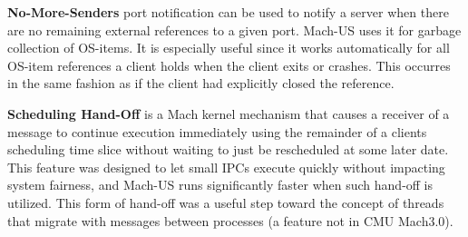 \begin{description}
\item{\bf No-More-Senders} port notification can be
used to notify a server when
there are no remaining external references to a given port.
Mach-US uses it for garbage collection of OS-items.  It is especially
useful since it works automatically for all OS-item references a client
holds when the client exits or crashes.  This occurres in the
same fashion as if the client had explicitly closed the reference.

\item{\bf Scheduling Hand-Off} is a Mach kernel mechanism that causes a
receiver of a message to continue execution immediately using the remainder
of a clients scheduling time slice without waiting to just be rescheduled
at some later date.  This feature was designed to let small IPCs execute
quickly without impacting system fairness, and Mach-US runs significantly
faster when such hand-off is utilized.  This form of hand-off was a
useful step toward the concept of threads that migrate with messages between
processes (a feature not in CMU Mach3.0).
\end{description}

